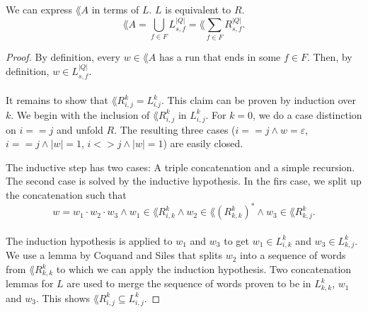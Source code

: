                             \begin{theorem} We can express $\lang{A}$ in terms of $L$. $L$ is equivalent to $R$.
                                \label{LR}
                                \begin{equation*}                          \lang{A} = \bigcup\limits_{f \in F} L^{|Q|}_{s, f} = \lang{\sum\limits_{f \in F} R^{|Q|}_{s, f}}.                            \end{equation*}
                                \end{theorem}

                                \begin{proof}
                                    By definition, every $w \in \lang{A}$ has a run that ends in some $f \in F$. 
                                    Then, by definition, $w \in  L^{|Q|}_{s, f}$. 

                                    \paragraph{}
                                    It remains to show that $\lang{R^k_{i,j}} = L^k_{i.j}$. 
                                    This claim can be proven by induction over $k$. 
                                    We begin with the inclusion of $\lang{R^k_{i,j}}$ in $L^k_{i,j}$. 
                                    For $k=0$, we do a case distinction on $i==j$ and unfold $R$. 
                                    The resulting three cases ($i==j \wedge w=\varepsilon$, $i==j \wedge |w|=1$, $i<>j \wedge |w|=1$) are easily closed. 

                                    The inductive step has two cases: A triple concatenation and a simple recursion. 
                                    The second case is solved by the inductive hypothesis.
                                    In the firs case, we split up the concatenation such that
                                    \begin{equation*}
                                        w = w_1 \cdot w_2 \cdot w_3 
                                        \wedge w_1 \in \lang{R^k_{i,k}} 
                                        \wedge w_2 \in \lang{(R^k_{k,k})^*} 
                                        \wedge w_3 \in \lang{R^k_{k,j}}.                               
                                    \end{equation*}
                                    \paragraph{}
                                    The induction hypothesis is applied to $w_1$ and $w_3$ to get $w_1 \in L^k_{i,k}$ and $w_3 \in L^k_{k,j}$.
                                    We use a lemma by Coquand and Siles that splits $w_2$ into a sequence of words from $\lang{R^k_{k,k}}$ to which we can apply the induction hypothesis. 
                                    Two concatenation lemmas for $L$ are used to merge the sequence of words proven to be in $L^k_{k,k}$,
                                    $w_1$ and $w_3$. This shows $\lang{R^k_{i,j}} \subseteq L^k_{i,j}$.


\end{proof}
